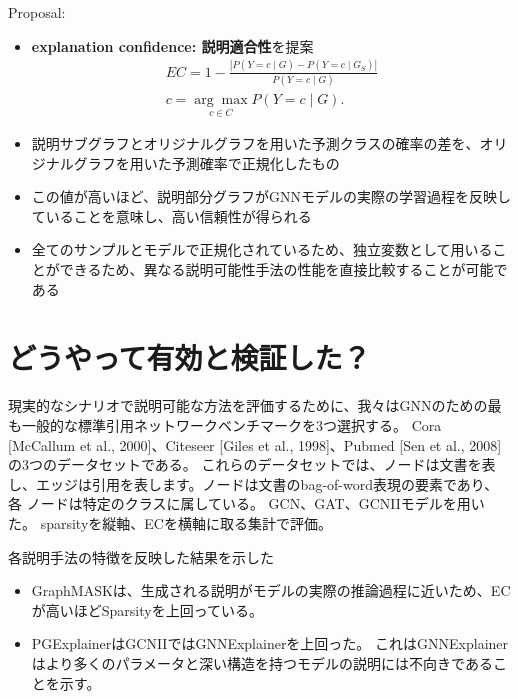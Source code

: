 \documentclass[a4paper,10pt]{ltjsarticle}
\newcommand{\1}{\mbox{1}\hspace{-0.25em}\mbox{l}}
\theoremstyle{definition}
\begin{document}
    Proposal:
    \begin{itemize}
        \item \textbf{explanation confidence: 説明適合性}を提案
        \begin{equation}
            \begin{gathered}
                E C=1-\frac{\left|P(Y=c \mid G)-P\left(Y=c \mid G_{S}\right)\right|}{P(Y=c \mid G)} \\
                c=\underset{c \in C}{\arg \max } P(Y=c \mid G) .
            \end{gathered}
        \end{equation}
        \item 説明サブグラフとオリジナルグラフを用いた予測クラスの確率の差を、オリジナルグラフを用いた予測確率で正規化したもの
        \item この値が高いほど、説明部分グラフがGNNモデルの実際の学習過程を反映していることを意味し、高い信頼性が得られる
        \item 全てのサンプルとモデルで正規化されているため、独立変数として用いることができるため、異なる説明可能性手法の性能を直接比較することが可能である
    \end{itemize}


    \section{どうやって有効と検証した？}
    現実的なシナリオで説明可能な方法を評価するために、我々はGNNのための最も一般的な標準引用ネットワークベンチマークを3つ選択する。
    Cora [McCallum et al., 2000]、Citeseer [Giles et al., 1998]、Pubmed [Sen et al., 2008]の3つのデータセットである。
    これらのデータセットでは、ノードは文書を表し、エッジは引用を表します。ノードは文書のbag-of-word表現の要素であり、各
    ノードは特定のクラスに属している。
    GCN、GAT、GCNIIモデルを用いた。
    sparsityを縦軸、ECを横軸に取る集計で評価。

    各説明手法の特徴を反映した結果を示した
    \begin{itemize}
        \item GraphMASKは、生成される説明がモデルの実際の推論過程に近いため、ECが高いほどSparsityを上回っている。
        \item PGExplainerはGCNIIではGNNExplainerを上回った。
        これはGNNExplainerはより多くのパラメータと深い構造を持つモデルの説明には不向きであることを示す。
    \end{itemize}
\end{document}
